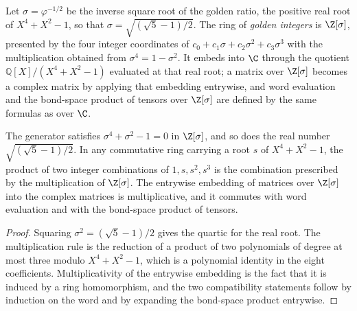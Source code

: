 \begin{definition}
    \label{def:asymex_golden_ring}
    \leanok
    Let $\sigma=\varphi^{-1/2}$ be the inverse square root of the golden
    ratio, the positive real root of $X^4+X^2-1$, so that
    $\sigma=\sqrt{(\sqrt5-1)/2}$. The ring of \emph{golden integers} is
    $\Z[\sigma]$, presented by the four integer coordinates of
    $c_0+c_1\sigma+c_2\sigma^2+c_3\sigma^3$ with the multiplication obtained
    from $\sigma^4=1-\sigma^2$. It embeds into $\C$ through the quotient
    $\mathbb{Q}[X]/(X^4+X^2-1)$ evaluated at that real root; a matrix over
    $\Z[\sigma]$ becomes a complex matrix by applying that embedding
    entrywise, and word evaluation and the bond-space product of tensors
    over $\Z[\sigma]$ are defined by the same formulas as over $\C$.
\end{definition}

\begin{theorem}
    \label{thm:asymex_golden_ring}
    \leanok
    The generator satisfies $\sigma^4+\sigma^2-1=0$ in $\Z[\sigma]$, and so
    does the real number $\sqrt{(\sqrt5-1)/2}$. In any commutative ring
    carrying a root $s$ of $X^4+X^2-1$, the product of two integer
    combinations of $1,s,s^2,s^3$ is the combination prescribed by the
    multiplication of $\Z[\sigma]$. The entrywise embedding of matrices
    over $\Z[\sigma]$ into the complex matrices is multiplicative, and it
    commutes with word evaluation and with the bond-space product of
    tensors.
\end{theorem}

\begin{proof}
    \leanok
    Squaring $\sigma^2=(\sqrt5-1)/2$ gives the quartic for the real root.
    The multiplication rule is the reduction of a product of two
    polynomials of degree at most three modulo $X^4+X^2-1$, which is a
    polynomial identity in the eight coefficients. Multiplicativity of the
    entrywise embedding is the fact that it is induced by a ring
    homomorphism, and the two compatibility statements follow by induction
    on the word and by expanding the bond-space product entrywise.
\end{proof}

